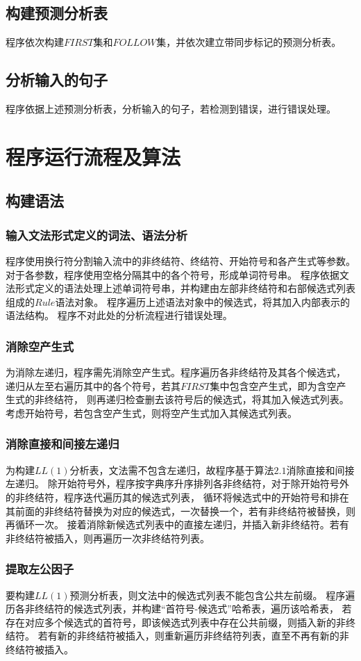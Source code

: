 \documentclass[UTF8]{ctexart}
\begin{document}
\subsection{构建预测分析表}
程序依次构建$FIRST$集和$FOLLOW$集，并依次建立带同步标记的预测分析表。
\subsection{分析输入的句子}
程序依据上述预测分析表，分析输入的句子，若检测到错误，进行错误处理。
\section{程序运行流程及算法}
\subsection{构建语法}
\subsubsection{输入文法形式定义的词法、语法分析}
程序使用换行符分割输入流中的非终结符、终结符、开始符号和各产生式等参数。对于各参数，程序使用空格分隔其中的各个符号，形成单词符号串。
程序依据文法形式定义的语法处理上述单词符号串，并构建由左部非终结符和右部候选式列表组成的$Rule$语法对象。
程序遍历上述语法对象中的候选式，将其加入内部表示的语法结构。
程序不对此处的分析流程进行错误处理。
\subsubsection{消除空产生式}
为消除左递归，程序需先消除空产生式。程序遍历各非终结符及其各个候选式，
递归从左至右遍历其中的各个符号，若其$FIRST$集中包含空产生式，即为含空产生式的非终结符，
则再递归检查删去该符号后的候选式，将其加入候选式列表。
考虑开始符号，若包含空产生式，则将空产生式加入其候选式列表。
\subsubsection{消除直接和间接左递归}
为构建$LL(1)$分析表，文法需不包含左递归，故程序基于算法$2.1$消除直接和间接左递归。
除开始符号外，程序按字典序升序排列各非终结符，对于除开始符号外的非终结符，程序迭代遍历其的候选式列表，
循环将候选式中的开始符号和排在其前面的非终结符替换为对应的候选式，一次替换一个，若有非终结符被替换，则再循环一次。
接着消除新候选式列表中的直接左递归，并插入新非终结符。若有非终结符被插入，则再遍历一次非终结符列表。
\subsubsection{提取左公因子}
要构建$LL(1)$预测分析表，则文法中的候选式列表不能包含公共左前缀。
程序遍历各非终结符的候选式列表，并构建“首符号-候选式”哈希表，遍历该哈希表，
若存在对应多个候选式的首符号，即该候选式列表中存在公共前缀，则插入新的非终结符。
若有新的非终结符被插入，则重新遍历非终结符列表，直至不再有新的非终结符被插入。
\end{document}
